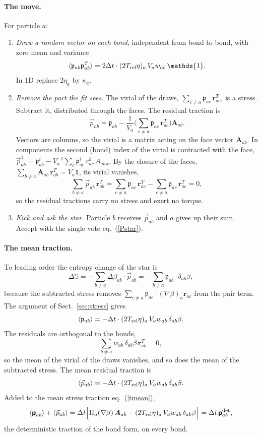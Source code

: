 \documentclass[11pt,aps,preprint,nofootinbib,superscriptaddress,tightenlines]{revtex4-2}
\def\st{\begin{equation}}
\def\stp{\end{equation}}
\def\Eq#1{eq.~(\ref{#1})}
\def\Sect#1{Sect.~\ref{#1}}
\newcommand{\one}{\mathds{1}}
\newcommand{\pf}{\bm{\mathsf p}}
\newcommand{\avg}[1]{\langle #1\rangle}
\let\oldparagraph\paragraph
\renewcommand{\paragraph}{\par\bigskip\oldparagraph}
\begin{document}
\paragraph{The move.}  For particle $a$:
\begin{enumerate}
\item \emph{Draw a random vector on each bond}, independent from bond to bond,
  with zero mean and variance
  \st
  \avg{\mathfrak p_{ab}\mathfrak p_{ab}^T}=2\Delta t\cdot (2T_{\rm rel}\eta)_a\,V_aw_{ab}\,\one .
  \stp
  In 1D replace $2\eta_a$ by $\kappa_a$.
\item \emph{Remove the part the fit sees.}  The virial of the draws,
  $\sum_{c\neq a}\mathfrak p_{ac}\,\bm r_{ac}^T$, is a stress.  Subtract it,
  distributed through the faces.  The residual traction is
  \st
  \vec p_{ab}=\mathfrak p_{ab}-\frac1{V_a}\Big(\sum_{c\neq a}\mathfrak p_{ac}\,\bm r_{ac}^T\Big)\bm A_{ab} .
  \label{tauab}
  \stp
  Vectors are columns, so the virial is a matrix acting on the face vector
  $\bm A_{ab}$.  In components the second (bond) index of the virial is
  contracted with the face,
  $\vec p^{\,i}_{ab}=\mathfrak p^i_{ab}-V_a^{-1}\sum_c\mathfrak p^i_{ac}\,r^k_{ac}\,A_{ab\,k}$.
  By the closure of the faces, $\sum_{b\neq a}\bm A_{ab}\,\bm r_{ab}^T=V_a\one$,
  its virial vanishes,
  \st
  \sum_{b\neq a}\vec p_{ab}\,\bm r_{ab}^T
  =\sum_{c\neq a}\mathfrak p_{ac}\,\bm r_{ac}^T-\sum_{c\neq a}\mathfrak p_{ac}\,\bm r_{ac}^T=0 ,
  \stp
  so the residual tractions carry no stress and exert no torque.
\item \emph{Kick and ask the star.}  Particle $b$ receives $\vec p_{ab}$ and $a$
  gives up their sum.  Accept with the single vote \Eq{Pstar}.
\end{enumerate}

\paragraph{The mean traction.}  To leading order the entropy change of the
star is
\st
\Delta\mathbb S=-\sum_{b\neq a}\Delta\beta_{ab}\cdot\vec p_{ab}
=-\sum_{b\neq a}\mathfrak p_{ab}\cdot\delta_{ab}\beta ,
\stp
because the subtracted stress removes $\sum_{c\neq a}\mathfrak p_{ac}\cdot (\nabla\beta)_a\bm r_{ac}$
from the pair term.  The argument of \Sect{sec:stress} gives
\st
\avg{\mathfrak p_{ab}}=-\Delta t\cdot (2T_{\rm rel}\eta)_a\,V_aw_{ab}\,\delta_{ab}\beta .
\stp
The residuals are orthogonal to the bonds,
\st
\sum_{b\neq a}w_{ab}\,\delta_{ab}\beta\,\bm r_{ab}^T=0 ,
\stp
so the mean of the virial of the draws vanishes, and so does the mean of the
subtracted stress.
The mean residual traction is
\st
\avg{\vec p_{ab}}=-\Delta t\cdot (2T_{\rm rel}\eta)_a\,V_aw_{ab}\,\delta_{ab}\beta .
\stp
Added to the mean stress traction \Eq{tmean},
\st
\avg{\pf_{ab}}+\avg{\vec p_{ab}}
=\Delta t\Big[\Pi_a(\nabla\beta)\,\bm A_{ab}-(2T_{\rm rel}\eta)_a\,V_aw_{ab}\,\delta_{ab}\beta\Big]
=\Delta t\,\pf^{\rm det}_{ab} ,
\stp
the deterministic traction of the bond form, on every bond.
\end{document}

